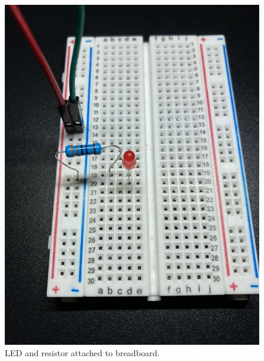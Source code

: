 \documentclass{article}\usepackage[]{graphicx}\usepackage[]{color}
\begin{document}
\begin{enumerate}
\begin{figure}
  \captionsetup{margin=10pt}
\begin{minipage}{.5\textwidth}
  \centering
  \includegraphics[width=\textwidth]{bbledres}
  \caption{LED and resistor attached to breadboard.}
  \label{fig:bbledres}
\end{minipage}%
\begin{minipage}{.5\textwidth}
  \centering

\end{minipage}
\end{figure}
\end{enumerate}
\end{document}
